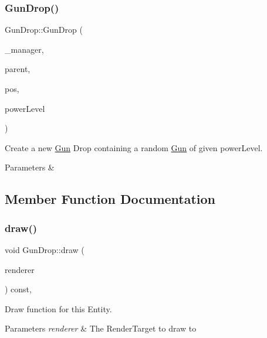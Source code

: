 \subsubsection{\texorpdfstring{GunDrop()}{GunDrop()}\hspace{0.1cm}{\footnotesize\ttfamily [2/2]}}
{\footnotesize\ttfamily Gun\+Drop\+::\+Gun\+Drop (\begin{DoxyParamCaption}\item[{\mbox{\hyperlink{class_game_manager}{Game\+Manager}} $\ast$}]{\+\_\+manager,  }\item[{\mbox{\hyperlink{class_game_entity}{Game\+Entity}} $\ast$}]{parent,  }\item[{\mbox{\hyperlink{classsf_1_1_vector2}{sf\+::\+Vector2f}}}]{pos,  }\item[{float}]{power\+Level }\end{DoxyParamCaption})}



Create a new \mbox{\hyperlink{class_gun}{Gun}} Drop containing a random \mbox{\hyperlink{class_gun}{Gun}} of given power\+Level. 


\begin{DoxyParams}{Parameters}
{\em } & \\
\hline
\end{DoxyParams}


\subsection{Member Function Documentation}
\mbox{\label{class_gun_drop_a418a09a73fbb7e710065c8a2c525a866}} 
\subsubsection{\texorpdfstring{draw()}{draw()}}
{\footnotesize\ttfamily void Gun\+Drop\+::draw (\begin{DoxyParamCaption}\item[{\mbox{\hyperlink{classsf_1_1_render_target}{sf\+::\+Render\+Target}} \&}]{renderer }\end{DoxyParamCaption}) const\hspace{0.3cm}{\ttfamily [override]}, {\ttfamily [virtual]}}



Draw function for this Entity. 


\begin{DoxyParams}{Parameters}
{\em renderer} & The Render\+Target to draw to \\
\hline
\end{DoxyParams}


